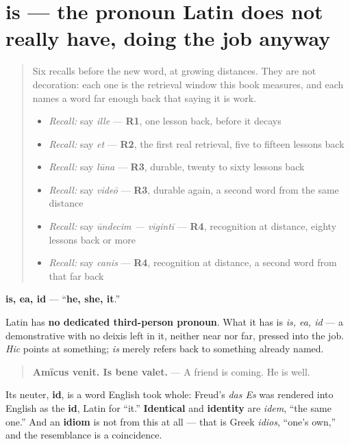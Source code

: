 \section[is, ea, id]{is — the pronoun Latin does not really have, doing the job anyway}

\label{lesson:LA-C50-is}



\begin{quote}
Six recalls before the new word, at growing distances. They are not decoration: each one is the retrieval window this book measures, and each names a word far enough back that saying it is work.

\begin{itemize}
\raggedright
  \item \emph{Recall:} say \emph{ille} — \textbf{R1}, one lesson back, before it decays
  \item \emph{Recall:} say \emph{et} — \textbf{R2}, the first real retrieval, five to fifteen lessons back
  \item \emph{Recall:} say \emph{lūna} — \textbf{R3}, durable, twenty to sixty lessons back
  \item \emph{Recall:} say \emph{videō} — \textbf{R3}, durable again, a second word from the same distance
  \item \emph{Recall:} say \emph{ūndecim — vīgintī} — \textbf{R4}, recognition at distance, eighty lessons back or more
  \item \emph{Recall:} say \emph{canis} — \textbf{R4}, recognition at distance, a second word from that far back
\end{itemize}
\end{quote}

\begin{cousinweb}
\textbf{is, ea, id} — \textquotedblleft{}\textbf{he, she, it}.\textquotedblright{}

Latin has \textbf{no dedicated third-person pronoun}. What it has is \emph{is, ea, id} — a demonstrative with no deixis left in it, neither near nor far, pressed into the job. \emph{Hic} points at something; \emph{is} merely refers back to something already named.

\begin{quote}
\textbf{Amīcus venit. Is bene valet.} — A friend is coming. He is well.
\end{quote}

Its neuter, \textbf{id}, is a word English took whole: Freud's \emph{das Es} was rendered into English as the \textbf{id}, Latin for \textquotedblleft{}it.\textquotedblright{} \textbf{Identical} and \textbf{identity} are \emph{idem}, \textquotedblleft{}the same one.\textquotedblright{} And an \textbf{idiom} is not from this at all — that is Greek \emph{idios}, \textquotedblleft{}one's own,\textquotedblright{} and the resemblance is a coincidence.
\end{cousinweb}


